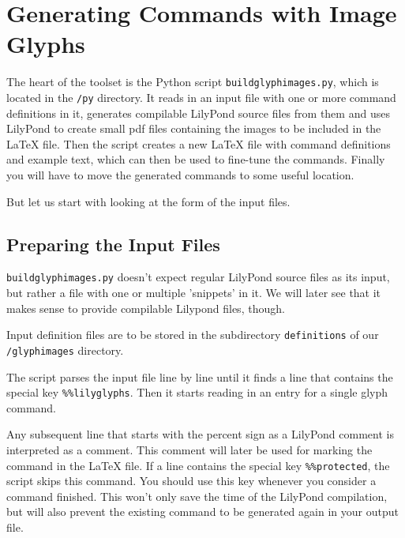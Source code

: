 \documentclass{OLLbook}
\begin{document}
\section{Generating Commands with Image Glyphs}
\label{sec:generating_commands_image}

The heart of the toolset is the Python script \texttt{buildglyphimages.py}, which is located in the \texttt{/py} directory.
It reads in an input file with one or more command definitions in it, generates compilable LilyPond source files from them and uses LilyPond to create small pdf files containing the images to be included in the \LaTeX{} file.
Then the script creates a new \LaTeX{} file with command definitions and example text, which can then be used to fine-tune the commands.
Finally you will have to move the generated commands to some useful location.

But let us start with looking at the form of the input files.


\subsection{Preparing the Input Files}
\label{subsec:BGI_preparing_input}
\texttt{buildglyphimages.py} doesn't expect regular LilyPond source files as its input, but rather a file with one or multiple 'snippets' in it. 
We will later see that it makes sense to provide compilable Lilypond files, though.

Input definition files are to be stored in the subdirectory \texttt{definitions} of our \texttt{/glyphimages} directory.

The script parses the input file line by line until it finds a line that contains the special key \verb|%%lilyglyphs|.																																																					
Then it starts reading in an entry for a single glyph command.

Any subsequent line that starts with the percent sign as a LilyPond comment is interpreted as a comment.
This comment will later be used for marking the command in the \LaTeX{} file.
If a line contains the special key \verb|%%protected|, the script skips this command.
You should use this key whenever you consider a command finished.
This won't only save the time of the LilyPond compilation, but will also prevent the existing command to be generated again in your output file.
\end{document}
